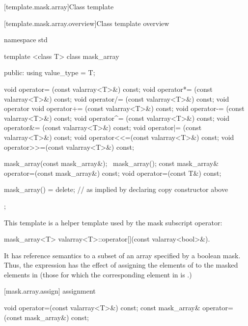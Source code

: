 [template.mask.array]{Class template }

[template.mask.array.overview]{Class template  overview}

%
\begin{codeblock}
namespace std {
  template <class T> class mask_array {
  public:
    using value_type = T;

    void operator=  (const valarray<T>&) const;
    void operator*= (const valarray<T>&) const;
    void operator/= (const valarray<T>&) const;
    void operator%
    void operator+= (const valarray<T>&) const;
    void operator-= (const valarray<T>&) const;
    void operator^= (const valarray<T>&) const;
    void operator&= (const valarray<T>&) const;
    void operator|= (const valarray<T>&) const;
    void operator<<=(const valarray<T>&) const;
    void operator>>=(const valarray<T>&) const;

    mask_array(const mask_array&);
   ~mask_array();
    const mask_array& operator=(const mask_array&) const;
    void operator=(const T&) const;

    mask_array() = delete;        // as implied by declaring copy constructor above
  };
}
\end{codeblock}

\pnum
This template is a helper template used by the mask subscript operator:

%
\begin{itemdecl}
mask_array<T> valarray<T>::operator[](const valarray<bool>&).
\end{itemdecl}

\begin{itemdescr}
\pnum
It has reference semantics to a subset of an array specified by a boolean mask.
Thus, the expression
has the effect of assigning the elements of
to the masked
elements in
(those for which the corresponding element
in
is
.)
\end{itemdescr}

[mask.array.assign]{ assignment}

%
\begin{itemdecl}
void operator=(const valarray<T>&) const;
const mask_array& operator=(const mask_array&) const;
\end{itemdecl}

